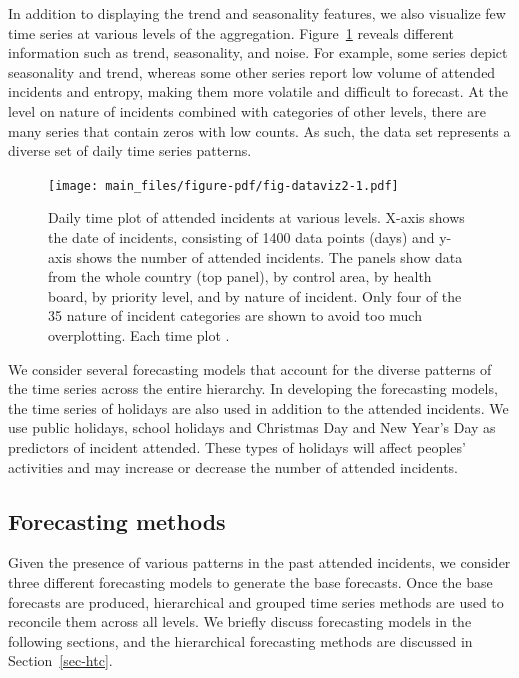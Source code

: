 \documentclass[
  authoryear,
  preprint,
  3p]{elsarticle}
\begin{document}
In addition to displaying the trend and seasonality features, we also
visualize few time series at various levels of the aggregation.
Figure~\ref{fig-dataviz2} reveals different information such as trend,
seasonality, and noise. For example, some series depict seasonality and
trend, whereas some other series report low volume of attended incidents
and entropy, making them more volatile and difficult to forecast. At the
level on nature of incidents combined with categories of other levels,
there are many series that contain zeros with low counts. As such, the
data set represents a diverse set of daily time series patterns.

\begin{figure}

{\centering \texttt{[image: main\_files/figure-pdf/fig-dataviz2-1.pdf]}

}

\caption{\label{fig-dataviz2}Daily time plot of attended incidents at
various levels. X-axis shows the date of incidents, consisting of 1400
data points (days) and y-axis shows the number of attended incidents.
The panels show data from the whole country (top panel), by control
area, by health board, by priority level, and by nature of incident.
Only four of the 35 nature of incident categories are shown to avoid too
much overplotting. Each time plot .}

\end{figure}

We consider several forecasting models that account for the diverse
patterns of the time series across the entire hierarchy. In developing
the forecasting models, the time series of holidays are also used in
addition to the attended incidents. We use public holidays, school
holidays and Christmas Day and New Year's Day as predictors of incident
attended. These types of holidays will affect peoples' activities and
may increase or decrease the number of attended incidents.

\hypertarget{forecasting-methods}{%
\subsection{Forecasting methods}\label{forecasting-methods}}

Given the presence of various patterns in the past attended incidents,
we consider three different forecasting models to generate the base
forecasts. Once the base forecasts are produced, hierarchical and
grouped time series methods are used to reconcile them across all
levels. We briefly discuss forecasting models in the following sections,
and the hierarchical forecasting methods are discussed in
Section~\ref{sec-htc}.
\end{document}
